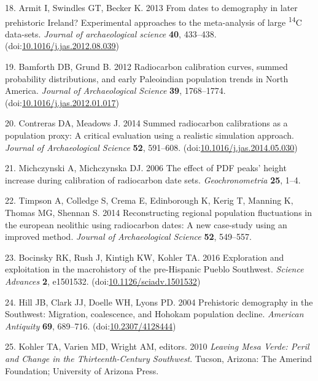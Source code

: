 \documentclass[
]{sa}
\newenvironment{cslreferences}%
  {}%
  {\par}
\begin{document}
\begin{cslreferences}
\leavevmode\hypertarget{ref-Armit2013}{}%
18. Armit I, Swindles GT, Becker K. 2013 From dates to demography in later prehistoric Ireland? Experimental approaches to the meta-analysis of large \textsuperscript{14}C data-sets. \emph{Journal of archaeological science} \textbf{40}, 433--438. (doi:\href{https://doi.org/10.1016/j.jas.2012.08.039}{10.1016/j.jas.2012.08.039})

\leavevmode\hypertarget{ref-Bamforth2012}{}%
19. Bamforth DB, Grund B. 2012 Radiocarbon calibration curves, summed probability distributions, and early Paleoindian population trends in North America. \emph{Journal of Archaeological Science} \textbf{39}, 1768--1774. (doi:\href{https://doi.org/10.1016/j.jas.2012.01.017}{10.1016/j.jas.2012.01.017})

\leavevmode\hypertarget{ref-Contreras2014}{}%
20. Contreras DA, Meadows J. 2014 Summed radiocarbon calibrations as a population proxy: A critical evaluation using a realistic simulation approach. \emph{Journal of Archaeological Science} \textbf{52}, 591--608. (doi:\href{https://doi.org/10.1016/j.jas.2014.05.030}{10.1016/j.jas.2014.05.030})

\leavevmode\hypertarget{ref-Michczynski2006}{}%
21. Michczynski A, Michczynska DJ. 2006 The effect of PDF peaks' height increase during calibration of radiocarbon date sets. \emph{Geochronometria} \textbf{25}, 1--4.

\leavevmode\hypertarget{ref-Timpson2014}{}%
22. Timpson A, Colledge S, Crema E, Edinborough K, Kerig T, Manning K, Thomas MG, Shennan S. 2014 Reconstructing regional population fluctuations in the european neolithic using radiocarbon dates: A new case-study using an improved method. \emph{Journal of Archaeological Science} \textbf{52}, 549--557.

\leavevmode\hypertarget{ref-Bocinsky2016}{}%
23. Bocinsky RK, Rush J, Kintigh KW, Kohler TA. 2016 Exploration and exploitation in the macrohistory of the pre-Hispanic Pueblo Southwest. \emph{Science Advances} \textbf{2}, e1501532. (doi:\href{https://doi.org/10.1126/sciadv.1501532}{10.1126/sciadv.1501532})

\leavevmode\hypertarget{ref-Hill2004}{}%
24. Hill JB, Clark JJ, Doelle WH, Lyons PD. 2004 Prehistoric demography in the Southwest: Migration, coalescence, and Hohokam population decline. \emph{American Antiquity} \textbf{69}, 689--716. (doi:\href{https://doi.org/10.2307/4128444}{10.2307/4128444})

\leavevmode\hypertarget{ref-Kohler2010b}{}%
25. Kohler TA, Varien MD, Wright AM, editors. 2010 \emph{Leaving Mesa Verde: Peril and Change in the Thirteenth-Century Southwest}. Tucson, Arizona: The Amerind Foundation; University of Arizona Press.


\end{cslreferences}
\end{document}
